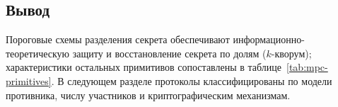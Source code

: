 \subsection{Вывод}

Пороговые схемы разделения секрета обеспечивают информационно-теоретическую защиту и восстановление секрета по долям (\(k\)-кворум); характеристики остальных примитивов сопоставлены в таблице~\ref{tab:mpc-primitives}. В следующем разделе протоколы классифицированы по модели противника, числу участников и криптографическим механизмам.